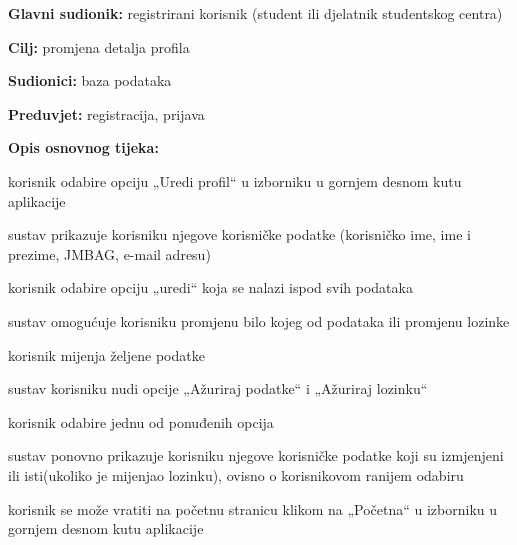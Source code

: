 	

\noindent {}
\begin{packed_item}
	
	\item \textbf{Glavni sudionik: } registrirani korisnik (student ili djelatnik studentskog centra)
	\item  \textbf{Cilj:}  promjena detalja profila
	\item  \textbf{Sudionici:} baza podataka
	\item  \textbf{Preduvjet:} registracija, prijava
	\item  \textbf{Opis osnovnog tijeka:}
	
	\item[] \begin{packed_enum}
		
		\item korisnik odabire opciju „Uredi profil“ u izborniku u gornjem desnom kutu aplikacije 
		\item sustav prikazuje korisniku njegove korisničke podatke (korisničko ime, ime i prezime, JMBAG, e-mail adresu)
		\item korisnik odabire opciju „uredi“ koja se nalazi ispod svih podataka
		\item sustav omogućuje korisniku promjenu bilo kojeg od podataka ili promjenu lozinke 
		\item korisnik mijenja željene podatke
		\item sustav korisniku nudi opcije „Ažuriraj podatke“ i „Ažuriraj lozinku“
		\item korisnik odabire jednu od ponuđenih opcija
		\item sustav ponovno prikazuje korisniku njegove korisničke podatke koji su izmjenjeni ili isti(ukoliko je mijenjao lozinku), ovisno o korisnikovom ranijem odabiru
		\item korisnik se može vratiti na početnu stranicu klikom na „Početna“ u izborniku u gornjem desnom kutu aplikacije
			
	\end{packed_enum}
	
\end{packed_item}



